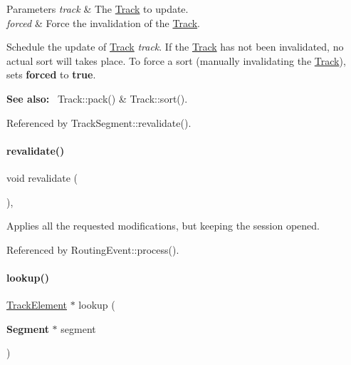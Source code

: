 \begin{DoxyParams}{Parameters}
{\em track} & The \hyperlink{classKite_1_1Track}{Track} to update. \\
\hline
{\em forced} & Force the invalidation of the {\ttfamily \hyperlink{classKite_1_1Track}{Track}}.\\
\hline
\end{DoxyParams}
Schedule the update of \hyperlink{classKite_1_1Track}{Track} {\itshape track}. If the {\ttfamily \hyperlink{classKite_1_1Track}{Track}} has not been invalidated, no actual sort will takes place. To force a sort (manually invalidating the {\ttfamily \hyperlink{classKite_1_1Track}{Track}}), sets {\bfseries forced} to {\bfseries true}.

{\bfseries See also\+:}~ Track\+::pack() \& Track\+::sort(). 

Referenced by Track\+Segment\+::revalidate().

\mbox{\label{classKite_1_1Session_a5bd93abe1416952ace15a98dbeeed124}} 
\paragraph{\texorpdfstring{revalidate()}{revalidate()}}
{\footnotesize\ttfamily void revalidate (\begin{DoxyParamCaption}{ }\end{DoxyParamCaption})\hspace{0.3cm}{\ttfamily [inline]}, {\ttfamily [static]}}

Applies all the requested modifications, but keeping the session opened. 

Referenced by Routing\+Event\+::process().

\mbox{\label{classKite_1_1Session_a1728621b96081c32fb7bfb18a0ebfad3}} 
\paragraph{\texorpdfstring{lookup()}{lookup()}\hspace{0.1cm}{\footnotesize\ttfamily [1/2]}}
{\footnotesize\ttfamily \hyperlink{classKite_1_1TrackElement}{Track\+Element} $\ast$ lookup (\begin{DoxyParamCaption}\item[{\textbf{ Segment} $\ast$}]{segment }\end{DoxyParamCaption})\hspace{0.3cm}{\ttfamily [static]}}

